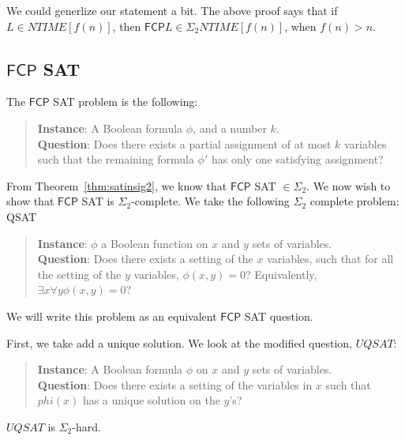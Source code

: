 \documentclass[runningheads,a4paper]{llncs}
\begin{document}
We could generlize our statement a bit. The above proof says that if $L \in NTIME[f(n)]$, then $\mathsf{FCP} L \in \Sigma_2 NTIME[f(n)]$, when $f(n) > n$. 

\subsection{$\mathsf{FCP}$ SAT}

The $\mathsf{FCP}$ SAT problem is the following:
\begin{quote}
\textbf{Instance}: A Boolean formula $\phi$, and a number $k$.\\
\textbf{Question}: Does there exists a partial assignment of at most $k$ variables such that the remaining formula $\phi'$ has only one satisfying assignment?
\end{quote}

From Theorem~\ref{thm:satinsig2}, we know that $\mathsf{FCP}$ SAT $\in \Sigma_2$. We now wish to show that $\mathsf{FCP}$ SAT is $\Sigma_2$-complete. We take the following $\Sigma_2$ complete problem: QSAT 
\begin{quote}
\textbf{Instance}: $\phi$ a Boolean function on $x$ and $y$ sets of variables. \\ 
\textbf{Question}: Does there exists a setting of the $x$ variables, such that for all the setting of the $y$ variables, $\phi(x,y) = 0$? Equivalently,$\exists x \forall y \phi(x,y) = 0$?
\end{quote}
We will write this problem as an equivalent $\mathsf{FCP}$ SAT question.

First, we take add a unique solution. We look at the modified question, $UQSAT$:
\begin{quote} 
\textbf{Instance}: A Boolean formula $\phi$ on $x$ and $y$ sets of variables. \\
\textbf{Question}: Does there exists a setting of the variables in $x$ such that $phi(x)$ has a unique solution on the $y$'s?
\end{quote}

\begin{lemma}
$UQSAT$ is $\Sigma_2$-hard.
\end{lemma}
\end{document}
